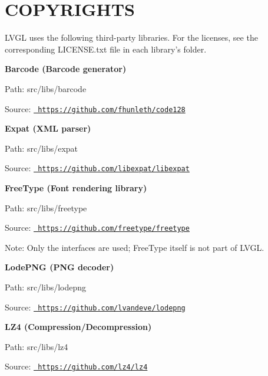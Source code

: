 \chapter{COPYRIGHTS}
\hypertarget{md_managed__components_2lvgl____lvgl_2COPYRIGHTS}{}\label{md_managed__components_2lvgl____lvgl_2COPYRIGHTS}
LVGL uses the following third-\/party libraries. For the licenses, see the corresponding {\ttfamily LICENSE.\+txt} file in each library’s folder.

{\bfseries{Barcode (Barcode generator)}}
\begin{DoxyItemize}
\item Path\+: src/libs/barcode
\item Source\+: \href{https://github.com/fhunleth/code128}{\texttt{ https\+://github.\+com/fhunleth/code128}}
\end{DoxyItemize}

{\bfseries{Expat (XML parser)}}
\begin{DoxyItemize}
\item Path\+: src/libs/expat
\item Source\+: \href{https://github.com/libexpat/libexpat}{\texttt{ https\+://github.\+com/libexpat/libexpat}}
\end{DoxyItemize}

{\bfseries{Free\+Type (Font rendering library)}}
\begin{DoxyItemize}
\item Path\+: src/libs/freetype
\item Source\+: \href{https://github.com/freetype/freetype}{\texttt{ https\+://github.\+com/freetype/freetype}}
\item Note\+: Only the interfaces are used; Free\+Type itself is not part of LVGL.
\end{DoxyItemize}

{\bfseries{Lode\+PNG (PNG decoder)}}
\begin{DoxyItemize}
\item Path\+: src/libs/lodepng
\item Source\+: \href{https://github.com/lvandeve/lodepng}{\texttt{ https\+://github.\+com/lvandeve/lodepng}}
\end{DoxyItemize}

{\bfseries{LZ4 (Compression/\+Decompression)}}
\begin{DoxyItemize}
\item Path\+: src/libs/lz4
\item Source\+: \href{https://github.com/lz4/lz4}{\texttt{ https\+://github.\+com/lz4/lz4}}
\end{DoxyItemize}

